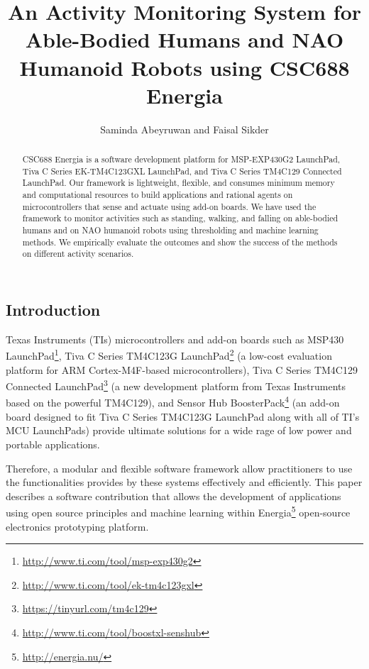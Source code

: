 \documentclass{llncs}
\begin{document}
\begin{sloppy}
\title{An Activity Monitoring System for Able-Bodied Humans and NAO Humanoid Robots using CSC688
Energia}
\author{Saminda Abeyruwan and Faisal Sikder}

\maketitle

\begin{abstract}
CSC688 Energia is a software development platform for MSP-EXP430G2 LaunchPad, Tiva C Series
EK-TM4C123GXL LaunchPad, and Tiva C Series TM4C129 Connected LaunchPad. Our framework is
lightweight, flexible, and consumes minimum memory and computational resources to build
applications and rational agents on microcontrollers that sense and actuate using add-on boards. We
have used the framework to monitor activities such as standing, walking, and falling on able-bodied
humans and on NAO humanoid robots using thresholding and machine learning methods. We empirically
evaluate the outcomes and show the success of the methods on different activity scenarios.  
\end{abstract}


\section{Introduction}

Texas Instruments (TIs) microcontrollers and add-on boards such as MSP430{\texttrademark}
LaunchPad\footnote{\url{http://www.ti.com/tool/msp-exp430g2}},
Tiva{\texttrademark} C Series TM4C123G
LaunchPad\footnote{\url{http://www.ti.com/tool/ek-tm4c123gxl}} (a low-cost evaluation platform for
ARM
Cortex-M4F-based microcontrollers), Tiva C Series TM4C129 Connected
LaunchPad\footnote{\url{https://tinyurl.com/tm4c129}} (a new
development platform from Texas Instruments
based on the powerful TM4C129), and Sensor
Hub BoosterPack\footnote{\url{http://www.ti.com/tool/boostxl-senshub}} (an add-on board designed to
fit Tiva C Series TM4C123G LaunchPad
along with all of TI’s MCU LaunchPads) provide ultimate solutions
for a wide rage of low power and portable applications.

Therefore, a modular and flexible software
framework allow practitioners to use the functionalities provides by these systems effectively
and efficiently. This paper describes a software contribution that allows the development of
applications using open source principles and machine learning within
Energia\footnote{\url{http://energia.nu/}} open-source electronics prototyping platform.


\end{sloppy}
\end{document}
